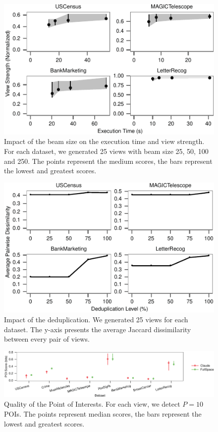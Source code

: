 \begin{figure}[t!]
\centering
\includegraphics[width=0.95\columnwidth]{plots/view-vary-beam}
\caption{Impact of the beam size on the execution time and view strength. For
each dataset, we generated 25 views with beam size 25, 50, 100 and 250. The
points represent the medium scores, the bars represent the lowest and greatest
scores.}
\label{pic:view-beam}
\end{figure}
\begin{figure}[t!]
\centering
\includegraphics[width=0.95\columnwidth]{plots/view-vary-diversification}
\caption{Impact of the deduplication. We generated 25 views for each dataset.
The y-axis presents the average Jaccard dissimilarity between every pair of
views.}
\label{pic:view-diversification}
\end{figure}
\begin{figure}[t!]
\centering
\includegraphics[width=1.75\columnwidth]{plots/POI-score}
\caption{Quality of the Point of Interests. For each view, we detect $P=10$
POIs. The
    points represent median scores, the bars represent the lowest and greatest
    scores.}
\label{pic:POI-quali}
\end{figure}
